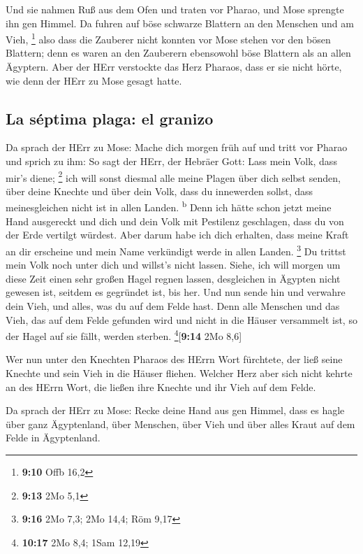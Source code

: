  Und sie nahmen Ruß aus dem Ofen und traten vor Pharao,
und Mose sprengte ihn gen Himmel. Da fuhren auf böse schwarze Blattern
an den Menschen und am Vieh, \footnote{\textbf{9:10} Offb 16,2}
 also dass die Zauberer nicht konnten vor Mose stehen vor
den bösen Blattern; denn es waren an den Zauberern ebensowohl böse
Blattern als an allen Ägyptern.  Aber der HErr verstockte
das Herz Pharaos, dass er sie nicht hörte, wie denn der HErr zu Mose
gesagt hatte.

\hypertarget{la-suxe9ptima-plaga-el-granizo}{%
\subsection{La séptima plaga: el
granizo}\label{la-suxe9ptima-plaga-el-granizo}}

 Da sprach der HErr zu Mose: Mache dich morgen früh auf
und tritt vor Pharao und sprich zu ihm: So sagt der HErr, der Hebräer
Gott: Lass mein Volk, dass mir's diene; \footnote{\textbf{9:13} 2Mo 5,1}
 ich will sonst diesmal alle meine Plagen über dich
selbst senden, über deine Knechte und über dein Volk, dass du innewerden
sollst, dass meinesgleichen nicht ist in allen Landen.
\textsuperscript{b}  Denn ich hätte schon jetzt meine
Hand ausgereckt und dich und dein Volk mit Pestilenz geschlagen, dass du
von der Erde vertilgt würdest.  Aber darum habe ich dich
erhalten, dass meine Kraft an dir erscheine und mein Name verkündigt
werde in allen Landen. \footnote{\textbf{9:16} 2Mo 7,3; 2Mo 14,4; Röm
  9,17}  Du trittst mein Volk noch unter dich und
willst's nicht lassen.  Siehe, ich will morgen um diese
Zeit einen sehr großen Hagel regnen lassen, desgleichen in Ägypten nicht
gewesen ist, seitdem es gegründet ist, bis her.  Und nun
sende hin und verwahre dein Vieh, und alles, was du auf dem Felde hast.
Denn alle Menschen und das Vieh, das auf dem Felde gefunden wird und
nicht in die Häuser versammelt ist, so der Hagel auf sie fällt, werden
sterben. \footnote{\textbf{10:17} 2Mo 8,4; 1Sam 12,19}{[}\textbf{9:14}
2Mo 8,6{]}

 Wer nun unter den Knechten Pharaos des HErrn Wort
fürchtete, der ließ seine Knechte und sein Vieh in die Häuser fliehen.
 Welcher Herz aber sich nicht kehrte an des HErrn Wort,
die ließen ihre Knechte und ihr Vieh auf dem Felde.

 Da sprach der HErr zu Mose: Recke deine Hand aus gen
Himmel, dass es hagle über ganz Ägyptenland, über Menschen, über Vieh
und über alles Kraut auf dem Felde in Ägyptenland.

